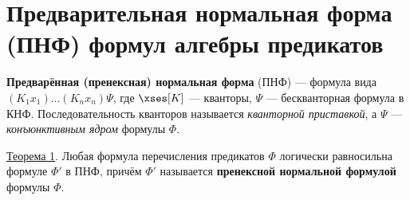 \section{Предварительная нормальная форма (ПНФ) формул алгебры предикатов}
\dftion \textbf{Предварённая (пренексная) нормальная форма} (ПНФ) --- формула вида $(K_1 x_1)\dots(K_n x_n)\Psi$, где $\xses[K]$ --- кванторы, $\Psi$ --- бескванторная формула в КНФ. Последовательность кванторов называется \textit{кванторной приставкой}, а $\Psi$ --- \textit{конъюнктивным ядром} формулы $\Phi$.

\underline{Теорема 1}. Любая формула перечисления предикатов $\Phi$ логически равносильна формуле $\Phi'$ в ПНФ, причём $\Phi'$ называется \textbf{пренексной нормальной формулой} формулы $\Phi$.